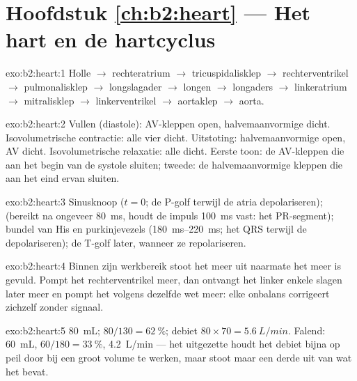 \section*{Hoofdstuk \ref{ch:b2:heart} --- Het hart en de hartcyclus}

\begin{solution}{exo:b2:heart:1}
Holle  $\to$ rechteratrium $\to$ tricuspidalisklep $\to$
rechterventrikel $\to$ pulmonalisklep $\to$ longslagader $\to$ longen
$\to$ longaders $\to$ linkeratrium $\to$ mitralisklep $\to$
linkerventrikel $\to$ aortaklep $\to$ aorta.
\end{solution}

\begin{solution}{exo:b2:heart:2}
Vullen (diastole): AV-kleppen open, halvemaanvormige dicht. Isovolumetrische
contractie: alle vier dicht. Uitstoting: halvemaanvormige open, AV dicht.
Isovolumetrische relaxatie: alle dicht. Eerste toon: de AV-kleppen die aan
het begin van de systole sluiten; tweede: de halvemaanvormige kleppen die aan
het eind ervan sluiten.
\end{solution}

\begin{solution}{exo:b2:heart:3}
Sinusknoop ($t = 0$; de P-golf terwijl de atria depolariseren);
 (bereikt na ongeveer \qty{80}{ms}, houdt de impuls
\qty{100}{ms} vast: het PR-segment); bundel van His en purkinjevezels
(\qtyrange{180}{220}{ms}; het QRS terwijl de  depolariseren); de
T-golf later, wanneer ze repolariseren.
\end{solution}

\begin{solution}{exo:b2:heart:4}
Binnen zijn werkbereik stoot het  meer uit naarmate het meer is
gevuld. Pompt het rechterventrikel meer, dan ontvangt het linker enkele
slagen later meer en pompt het volgens dezelfde wet meer: elke onbalans
corrigeert zichzelf zonder signaal.
\end{solution}

\begin{solution}{exo:b2:heart:5}
 \qty{80}{mL};  $80/130 = \qty{62}{\%}$;
debiet $80\times 70 = \qty{5.6}{L/min}$. Falend: \qty{60}{mL},
$60/180 = \qty{33}{\%}$, \qty{4.2}{L/min} --- het uitgezette  houdt
het debiet bijna op peil door bij een groot volume te werken, maar stoot maar
een derde uit van wat het bevat.
\end{solution}


